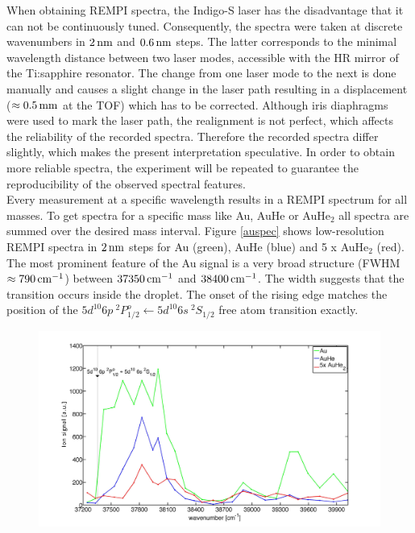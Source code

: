 \documentclass[parskip,12pt,headsepline,a4paper] {scrbook}
\begin{document}
When obtaining REMPI spectra, the Indigo-S laser has the disadvantage that it can not be continuously tuned. Consequently, the spectra were taken at discrete wavenumbers in $\unit[2]{nm}$ and $\unit[0.6]{nm}$ steps. The latter corresponds to the minimal wavelength distance between two laser modes, accessible with the HR mirror of the Ti:sapphire resonator. The change from one laser mode to the next is done manually and causes a slight change in the laser path resulting in a displacement ($\approx \unit[0.5]{mm}$ at the TOF) which has to be corrected. Although iris diaphragms were used to mark the laser path, the realignment is not perfect, which affects the reliability of the recorded spectra.
Therefore the recorded spectra differ slightly, which makes the present interpretation speculative. In order to obtain more reliable spectra, the experiment will be repeated to guarantee the reproducibility of the observed spectral features. \\
Every measurement at a specific wavelength results in a REMPI spectrum for all masses. To get spectra for a specific mass like Au, AuHe or AuHe$_2$ all spectra are summed over the desired mass interval. Figure \ref{auspec} shows low-resolution REMPI spectra in $\unit[2]{nm}$ steps for Au (green), AuHe (blue) and 5 x AuHe$_2$ (red). \\
The most prominent feature of the Au signal is a very broad structure (FWHM $\approx \unit[790]{cm^{-1}}$) between $\unit[37350]{cm^{-1}}$ and $\unit[38400]{cm^{-1}}$. The width suggests that the transition occurs inside the droplet. The onset of the rising edge matches the position of the $5d^{10}6p \ ^2P^o_{1/2} \leftarrow 5d^{10}6s \ ^2S_{1/2}$ free atom transition exactly.
\begin{figure}[ht]
\centerline{
\includegraphics[width=17.5cm]{./results/au_spec_new.jpg}}
\end{figure}
\end{document}
